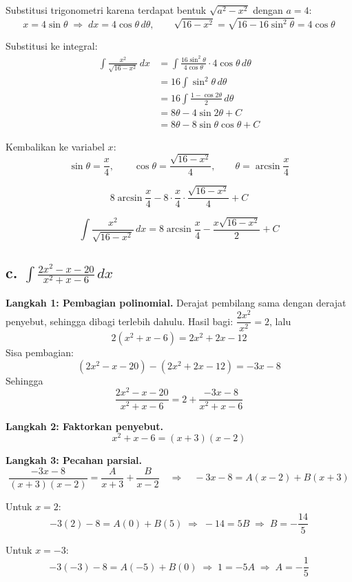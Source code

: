\documentclass[12pt]{article}
\begin{document}
Substitusi trigonometri karena terdapat bentuk $\sqrt{a^2 - x^2}$ dengan $a = 4$:
\[
x = 4\sin\theta \;\Rightarrow\; dx = 4\cos\theta\,d\theta, \qquad
\sqrt{16 - x^2} = \sqrt{16 - 16\sin^2\theta} = 4\cos\theta
\]

Substitusi ke integral:
\begin{align*}
\int \frac{x^2}{\sqrt{16-x^2}}\,dx
&= \int \frac{16\sin^2\theta}{4\cos\theta}\cdot 4\cos\theta\,d\theta \\
&= 16\int \sin^2\theta\,d\theta \\
&= 16\int \frac{1 - \cos 2\theta}{2}\,d\theta \\
&= 8\theta - 4\sin 2\theta + C \\
&= 8\theta - 8\sin\theta\cos\theta + C
\end{align*}

Kembalikan ke variabel $x$:
\[
\sin\theta = \frac{x}{4}, \qquad
\cos\theta = \frac{\sqrt{16-x^2}}{4}, \qquad
\theta = \arcsin\frac{x}{4}
\]

\[
8\arcsin\frac{x}{4} - 8\cdot\frac{x}{4}\cdot\frac{\sqrt{16-x^2}}{4} + C
\]

\[
\int \frac{x^2}{\sqrt{16-x^2}}\,dx = 8\arcsin\frac{x}{4} - \frac{x\sqrt{16-x^2}}{2} + C
\]

\subsection*{c. $\displaystyle\int \frac{2x^2 - x - 20}{x^2 + x - 6}\,dx$}

\textbf{Langkah 1: Pembagian polinomial.}
Derajat pembilang sama dengan derajat penyebut, sehingga dibagi terlebih dahulu.
Hasil bagi: $\dfrac{2x^2}{x^2} = 2$, lalu
\[
2(x^2 + x - 6) = 2x^2 + 2x - 12
\]
Sisa pembagian:
\[
(2x^2 - x - 20) - (2x^2 + 2x - 12) = -3x - 8
\]
Sehingga
\[
\frac{2x^2 - x - 20}{x^2 + x - 6} = 2 + \frac{-3x - 8}{x^2 + x - 6}
\]

\textbf{Langkah 2: Faktorkan penyebut.}
\[
x^2 + x - 6 = (x + 3)(x - 2)
\]

\textbf{Langkah 3: Pecahan parsial.}
\[
\frac{-3x - 8}{(x + 3)(x - 2)} = \frac{A}{x + 3} + \frac{B}{x - 2}
\quad\Longrightarrow\quad
-3x - 8 = A(x - 2) + B(x + 3)
\]

Untuk $x = 2$:
\[
-3(2) - 8 = A(0) + B(5) \;\Rightarrow\; -14 = 5B \;\Rightarrow\; B = -\frac{14}{5}
\]

Untuk $x = -3$:
\[
-3(-3) - 8 = A(-5) + B(0) \;\Rightarrow\; 1 = -5A \;\Rightarrow\; A = -\frac{1}{5}
\]
\end{document}
